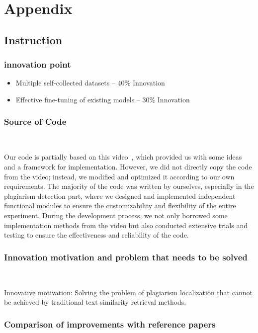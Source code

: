 \section{Appendix}

\subsection{Instruction}

\subsubsection{innovation point}
\begin{itemize}
    \item Multiple self-collected datasets -- 40\% Innovation
    \item Effective fine-tuning of existing models -- 30\% Innovation
\end{itemize}

\subsubsection{Source of Code}
\

Our code is partially based on this video~\cite{video}, which provided us with some ideas and a framework for implementation. However, we did not directly copy the code from the video; instead, we modified and optimized it according to our own requirements. The majority of the code was written by ourselves, especially in the plagiarism detection part, where we designed and implemented independent functional modules to ensure the customizability and flexibility of the entire experiment. During the development process, we not only borrowed some implementation methods from the video but also conducted extensive trials and testing to ensure the effectiveness and reliability of the code.

\subsubsection{Innovation motivation and problem that needs to be solved}
\

Innovative motivation: Solving the problem of plagiarism localization that cannot be achieved by traditional text similarity retrieval methods.

\subsubsection{Comparison of improvements with reference papers}
\

